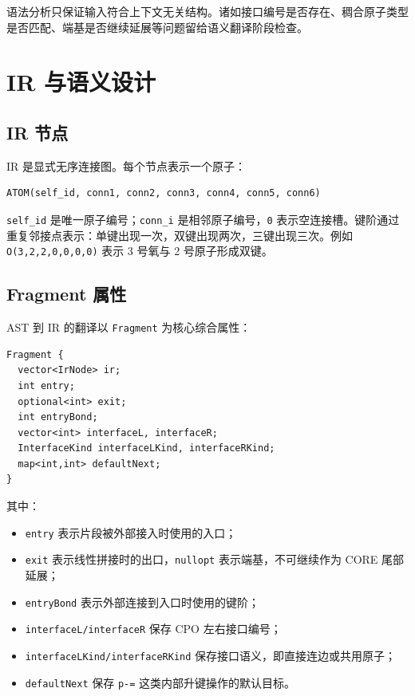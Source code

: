 \documentclass[UTF8,a4paper,11pt]{ctexart}
\begin{document}
语法分析只保证输入符合上下文无关结构。诸如接口编号是否存在、稠合原子类型是否匹配、端基是否继续延展等问题留给语义翻译阶段检查。

\section{IR 与语义设计}

\subsection{IR 节点}

IR 是显式无序连接图。每个节点表示一个原子：

\begin{lstlisting}
ATOM(self_id, conn1, conn2, conn3, conn4, conn5, conn6)
\end{lstlisting}

\verb|self_id| 是唯一原子编号；\verb|conn_i| 是相邻原子编号，\verb|0| 表示空连接槽。键阶通过重复邻接点表示：单键出现一次，双键出现两次，三键出现三次。例如 \verb|O(3,2,2,0,0,0,0)| 表示 3 号氧与 2 号原子形成双键。

\subsection{Fragment 属性}

AST 到 IR 的翻译以 \verb|Fragment| 为核心综合属性：

\begin{lstlisting}
Fragment {
  vector<IrNode> ir;
  int entry;
  optional<int> exit;
  int entryBond;
  vector<int> interfaceL, interfaceR;
  InterfaceKind interfaceLKind, interfaceRKind;
  map<int,int> defaultNext;
}
\end{lstlisting}

其中：
\begin{itemize}[leftmargin=2em]
  \item \verb|entry| 表示片段被外部接入时使用的入口；
  \item \verb|exit| 表示线性拼接时的出口，\verb|nullopt| 表示端基，不可继续作为 CORE 尾部延展；
  \item \verb|entryBond| 表示外部连接到入口时使用的键阶；
  \item \verb|interfaceL/interfaceR| 保存 CPO 左右接口编号；
  \item \verb|interfaceLKind/interfaceRKind| 保存接口语义，即直接连边或共用原子；
  \item \verb|defaultNext| 保存 \verb|p-=| 这类内部升键操作的默认目标。
\end{itemize}
\end{document}

